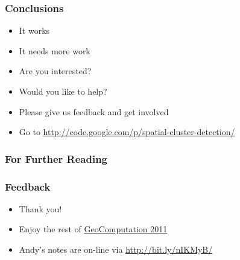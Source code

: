 \documentclass{beamer}
\begin{document}
\begin{frame}[t]
\frametitle{Conclusions}
\begin{itemize}
  \item It works
  \item It needs more work 
  \item Are you interested?
  \item Would you like to help?
  \item Please give us feedback and get involved
  \item Go to \href{http://code.google.com/p/spatial-cluster-detection/}{http://code.google.com/p/spatial-cluster-detection/}
\end{itemize}
\end{frame}

\begin{frame}[allowframebreaks]
\frametitle<presentation>{For Further Reading}    

\end{frame}

\begin{frame}[t]
\frametitle{Feedback}
\begin{itemize}
  \item Thank you!
  \item Enjoy the rest of \href{http://standard.cege.ucl.ac.uk/workshops/Geocomputation/}{GeoComputation 2011}
  \item Andy's notes are on-line via \href{http://bit.ly/nIKMyB}{http://bit.ly/nIKMyB/}
\end{itemize}
\end{frame}
\end{document}
